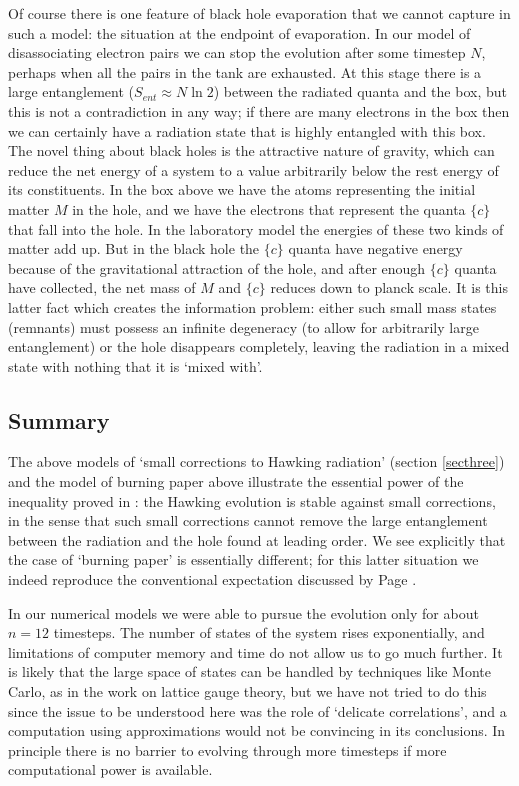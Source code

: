 \documentclass[11pt]{article}
\begin{document}
Of course there is one feature of black hole evaporation that we cannot capture in such a model: the situation at the endpoint of evaporation. In our model of disassociating electron pairs we can stop the evolution after some timestep $N$, perhaps when all the pairs in the tank are exhausted. At this stage there is a large entanglement ($S_{ent}\approx N\ln 2$) between the radiated quanta and the box, but this is not a contradiction in any way; if there are many electrons in the box then we can certainly have a radiation state that is highly entangled with this box. 
The novel thing about black holes is the attractive nature of gravity, which can reduce the net energy of a system to a value arbitrarily below the rest energy of its constituents. In the box above we have the atoms representing  the initial matter $M$ in the hole, and we have the electrons that represent the quanta $\{ c\}$ that fall into the hole. In the laboratory model the energies of these two kinds of matter add up. But in the black hole the $\{ c\}$ quanta have negative energy because of the gravitational attraction of the hole, and after enough $\{ c\}$ quanta have collected, the net mass of $M$ and $\{ c\}$ reduces down to planck scale. It is this latter fact which creates the information problem: either such small mass states (remnants) must possess an infinite degeneracy (to allow for arbitrarily large entanglement) or the hole disappears completely, leaving the radiation in a mixed state with nothing that it is `mixed with'. 

\subsection{Summary}

The above models of `small corrections to Hawking radiation' (section \ref{secthree}) and the model of burning paper above illustrate the essential power of the inequality proved in \cite{mathurfuzz}: the Hawking evolution is stable against small corrections, in the sense that such small corrections cannot remove the large entanglement between the radiation and the hole found at leading order. We see explicitly that the case of `burning paper' is essentially different; for this latter situation we indeed reproduce the conventional expectation discussed by Page \cite{page}. 

In our numerical models we were able to pursue the evolution only for about $n=12$ timesteps. The number of states of the system rises exponentially, and limitations of computer memory and time do not allow us to go much further. It is likely that the large space of states can be handled by techniques like Monte Carlo, as in the work on lattice gauge theory, but we have not tried to do this since the issue to be understood here was the role of `delicate correlations', and a computation using approximations would not be convincing in its conclusions. In principle there is no barrier to evolving through more timesteps if more computational power is available.
\end{document}
